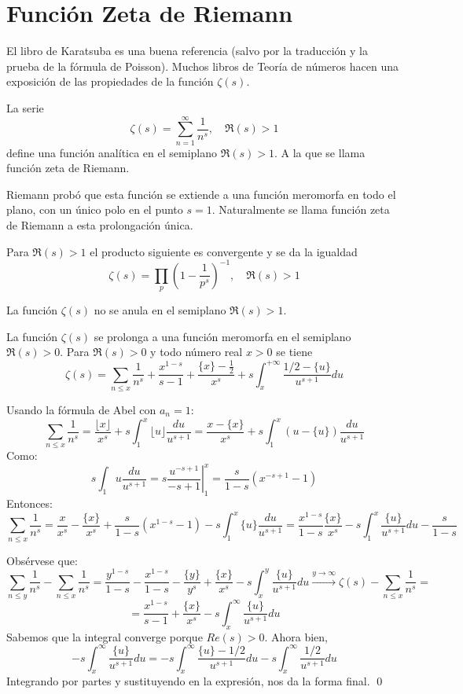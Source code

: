 \documentclass[TAN.tex]{subfiles}
\begin{document}
\section{Función Zeta de Riemann}
El libro de Karatsuba es una buena referencia (salvo por la traducción y la prueba de la fórmula de Poisson). Muchos libros de Teoría de números hacen una exposición de las propiedades de la función $ζ(s)$.
\begin{defi}
La serie
\[ ζ(s) = \sum_{n=1}^{∞} \frac{1}{n^s}, \quad \Re(s) > 1 \]
define una función analítica en el semiplano $\Re(s) > 1$. A la que se llama función zeta de Riemann.
\end{defi}
Riemann probó que esta función se extiende a una función meromorfa en todo el plano, con un único polo en el punto $s = 1$. Naturalmente se llama función zeta de Riemann a esta prolongación única.
\begin{teorema}
Para $\Re(s)>1$ el producto siguiente es convergente y se da la igualdad
\[ ζ(s) = \prod_p \left(1-\frac{1}{p^s}\right)^{-1}, \quad \Re(s) > 1 \]
\end{teorema}
\begin{coro}
La función $ζ(s)$ no se anula en el semiplano $\Re(s)>1$.
\end{coro}
\begin{teorema}
La función $ζ(s)$ se prolonga a una función meromorfa en el semiplano $\Re(s) > 0$. Para $\Re(s) > 0$ y todo número real $x > 0$ se tiene
\[ ζ(s) = \sum_{n ≤ x} \frac{1}{n^s} + \frac{x^{1-s}}{s-1} + \frac{\{x\}-\frac{1}{2}}{x^s} + s \int_x^{+∞} \frac{1/2-\{u\}}{u^{s+1}} du \]
\end{teorema}
\begin{dem}
Usando la fórmula de Abel con $a_n=1$:
\[ \sum_{n≤x} \frac{1}{n^s} = \frac{\lfloor x \rfloor}{x^s} + s\int_1^x \lfloor u \rfloor\frac{du}{u^{s+1}} = \frac{x-\{x\}}{x^s} + s \int_1^x (u-\{u\}) \frac{du}{u^{s+1}} \]
Como:
\[ s\int_1 u \frac{du}{u^{s+1}} = s \left.\frac{u^{-s+1}}{-s+1}\right|_1^x = \frac{s}{1-s}(x^{-s+1}-1) \]
Entonces:
\[ \sum_{n≤x} \frac{1}{n^s} = \frac{x}{x^s}-\frac{\{x\}}{x^s} + \frac{s}{1-s}(x^{1-s}-1)- s\int_1^x \{u\} \frac{du}{u^{s+1}} = \frac{x^{1-s}}{1-s}  \frac{\{x\}}{x^s} - s \int_1^x \frac{\{u\}}{u^{s+1}}du - \frac{s}{1-s} \]

Obsérvese que:
\[ \sum_{n≤y}\frac{1}{n^s} - \sum_{n≤x} \frac{1}{n^s} = \frac{y^{1-s}}{1-s} -\frac{x^{1-s}}{1-s}- \frac{\{y\}}{y^s} + \frac{\{x\}}{x^s} -s\int_x^y \frac{\{u\}}{u^{s+1}} du \xrightarrow{y \to ∞}ζ(s)-\sum_{n≤x} \frac{1}{n^s} = \]
\[ = \frac{x^{1-s}}{s-1}+ \frac{\{x\}}{x^s} -s\int_x^{∞} \frac{\{u\}}{u^{s+1}}du \]
Sabemos que la integral converge porque $Re(s)>0$. Ahora bien,
\[ -s\int_x^∞ \frac{\{u\}}{u^{s+1}} du = -s\int_x^{∞} \frac{\{u\}-1/2}{u^{s+1}} du - s\int_x^{∞} \frac{1/2}{u^{s+1}} du \]
Integrando por partes y sustituyendo en la expresión, nos da la forma final.
\qed
\end{dem}
\end{document}
